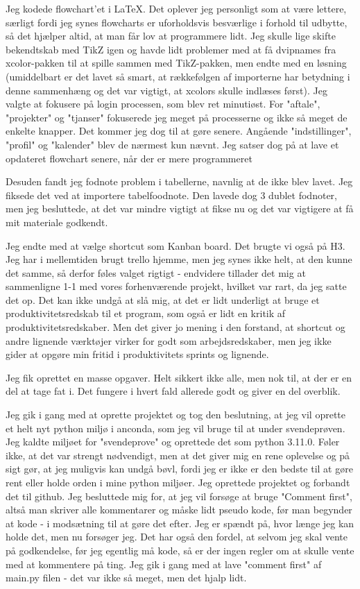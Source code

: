 \documentclass{report}
\begin{document}
Jeg kodede flowchart'et i LaTeX. Det oplever jeg personligt som at være lettere, særligt fordi jeg synes flowcharts er uforholdsvis besværlige i forhold til udbytte, så det hjælper altid, at man får lov at programmere lidt.
Jeg skulle lige skifte bekendtskab med TikZ igen og havde lidt problemer med at få dvipnames fra xcolor-pakken til at spille sammen med TikZ-pakken, men endte med en løsning (umiddelbart er det lavet så smart, at rækkefølgen af importerne har betydning i denne sammenhæng og det var vigtigt, at xcolors skulle indlæses først).
Jeg valgte at fokusere på login processen, som blev ret minutiøst. For "aftale", "projekter" og "tjanser" fokuserede jeg meget på processerne og ikke så meget de enkelte knapper. Det kommer jeg dog til at gøre senere. Angående "indstillinger", "profil" og "kalender" blev de nærmest kun nævnt.
Jeg satser dog på at lave et opdateret flowchart senere, når der er mere programmeret
 
Desuden fandt jeg fodnote problem i tabellerne, navnlig at de ikke blev lavet. Jeg fiksede det ved at importere tabelfoodnote. Den lavede dog 3 dublet fodnoter, men jeg besluttede, at det var mindre vigtigt at fikse nu og det var vigtigere at få mit materiale godkendt.
 
Jeg endte med at vælge shortcut som Kanban  board. Det brugte vi også på H3. Jeg har i mellemtiden brugt trello hjemme, men jeg synes ikke helt, at den kunne det samme, så derfor føles valget rigtigt - endvidere tillader det mig at sammenligne 1-1 med vores forhenværende projekt, hvilket var rart, da jeg satte det op.
Det kan ikke undgå at slå mig, at det er lidt underligt at bruge et produktivitetsredskab til et program, som også er lidt en kritik af produktivitetsredskaber. Men det giver jo mening i den forstand, at shortcut og andre lignende værktøjer virker for godt som arbejdsredskaber, men jeg ikke gider at opgøre min fritid i produktivitets sprints og lignende.
 
Jeg fik oprettet en masse opgaver. Helt sikkert ikke alle, men nok til, at der er en del at tage fat i. Det fungere i hvert fald allerede godt og giver en del overblik.
 
Jeg gik i gang med at oprette projektet og tog den beslutning, at jeg vil oprette et helt nyt python miljø i anconda, som jeg vil bruge til at under svendeprøven. Jeg kaldte miljøet for "svendeprove" og oprettede det som python 3.11.0.
Føler ikke, at det var strengt nødvendigt, men at det giver mig en rene oplevelse og på sigt gør, at jeg muligvis kan undgå bøvl, fordi jeg er ikke er den bedste til at gøre rent eller holde orden i mine python miljøer.
Jeg oprettede projektet og forbandt det til github.
Jeg besluttede mig for, at jeg vil forsøge at bruge "Comment first", altså man skriver alle kommentarer og måske lidt pseudo kode, før man begynder at kode - i modsætning til at gøre det efter. Jeg er spændt på, hvor længe jeg kan holde det, men nu forsøger jeg. Det har også den fordel, at selvom jeg skal vente på godkendelse, før jeg egentlig må kode, så er der ingen regler om at skulle vente med at kommentere på ting. Jeg gik i gang med at lave "comment first" af main.py filen - det var ikke så meget, men det hjalp lidt.
 
\end{document}
